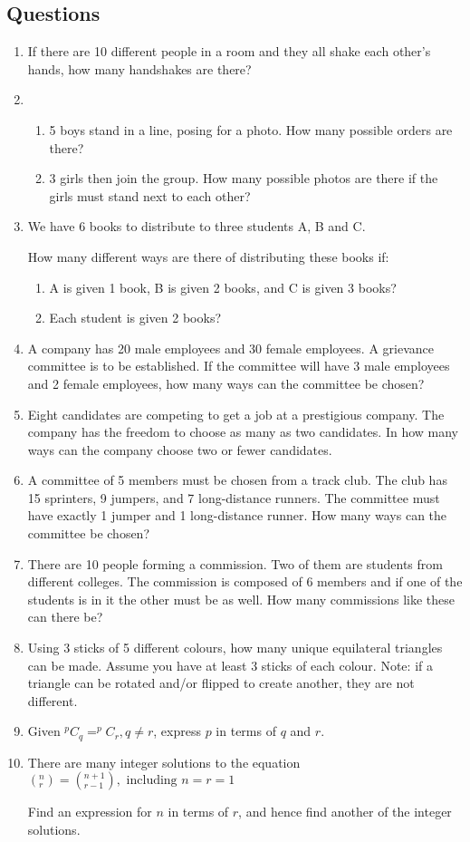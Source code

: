 \documentclass[../main.tex]{subfiles}
\begin{document}
\subsection*{Questions}
\label{Combinations and permuations}
\begin{enumerate}
    \item 
    If there are 10 different people in a room and they all shake each other’s hands, how many handshakes are there?
    \item 
        \begin{enumerate}
            \item 5 boys stand in a line, posing for a photo. How many possible orders are there?
            \item 3 girls then join the group. How many possible photos are there if the girls must stand next to each other?
        \end{enumerate}
    \item 
    We have 6 books to distribute to three students A, B and C.

    How many different ways are there of distributing these books if:
        \begin{enumerate}
            \item A is given 1 book, B is given 2 books, and C is given 3 books?
            \item Each student is given 2 books?
        \end{enumerate}
    \item 
    A company has 20 male employees and 30 female employees. A grievance committee is to be established. If the committee will have 3 male employees and 2 female employees, how many ways can the committee be chosen?
    \item 
    Eight candidates are competing to get a job at a prestigious company. The company has the freedom to choose as many as two candidates. In how many ways can the company choose two or fewer candidates.
    \item 
    A committee of 5 members must be chosen from a track club. The club has 15 sprinters, 9 jumpers, and 7 long-distance runners. The committee must have exactly 1 jumper and 1 long-distance runner. How many ways can the committee be chosen?
    \item 
    There are 10 people forming a commission. Two of them are students from different colleges. The commission is composed of 6 members and if one of the students is in it the other must be as well. How many commissions like these can there be?
    \item 
    Using 3 sticks of 5 different colours, how many unique equilateral triangles can be made. Assume you have at least 3 sticks of each colour. Note: if a triangle can be rotated and/or flipped to create another, they are not different.
    \item 
    Given \(^pC_q=^pC_r, q\neq r\), express \(p\) in terms of \(q\) and \(r\).
    \item 
    There are many integer solutions to the equation \((^n_r)=(^{n+1}_{r-1}),\text{ including } n=r=1 \)
    
    Find an expression for \(n\) in terms of \(r\), and hence find another of the integer solutions.
\end{enumerate}
\end{document}
